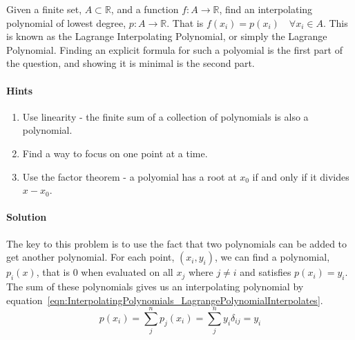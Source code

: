 Given a finite set, $A \subset \mathbb{R}$, and a function $f : A \to \mathbb{R}$, find an  interpolating polynomial of lowest degree, $p : A \to \mathbb{R}$. That is $f(x_i) = p(x_i) \quad \forall x_i \in A$. This is known as the Lagrange Interpolating Polynomial, or simply the Lagrange Polynomial. Finding an explicit formula for such a polyomial is the first part of the question, and showing it is minimal is the second part.

\paragraph{Hints}

\begin{enumerate}
    \item Use linearity - the finite sum of a collection of polynomials is also a polynomial.
    \item Find a way to focus on one point at a time.
    \item Use the factor theorem - a polyomial has a root at $x_0$ if and only if it divides $x - x_0$.
\end{enumerate}

\paragraph{Solution}

The key to this problem is to use the fact that two polynomials can be added to get another polynomial. For each point, $(x_i, y_i)$, we can find a polynomial, $p_i(x)$, that is $0$ when evaluated on all $x_j$ where $j \ne i$ and satisfies $p(x_i) = y_i$. The sum of these polynomials gives us an interpolating polynomial by equation~\eqref{eqn:InterpolatingPolynomials_LagrangePolynomialInterpolates}.
\begin{equation}
	p(x_i) = \sum_j^n p_j(x_i) = \sum_j^n y_i \delta_{ij} = y_i
	\label{eqn:InterpolatingPolynomials_LagrangePolynomialInterpolates}
\end{equation}

